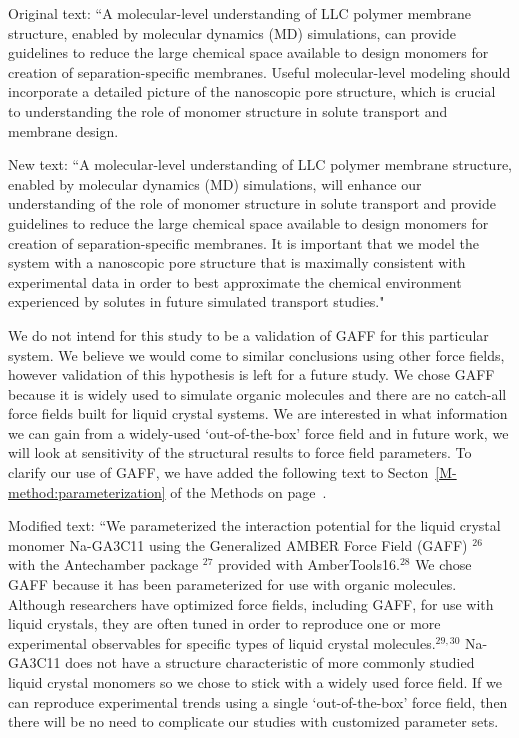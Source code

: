\documentclass{article}
\begin{document}
\begin{enumerate}
    Original text: ``A molecular-level understanding of LLC polymer membrane
    structure, enabled by molecular dynamics (MD) simulations, can provide
    guidelines to reduce the large chemical space available to design monomers for
    creation of separation-specific membranes. Useful molecular-level modeling
    should incorporate a detailed picture of the nanoscopic pore structure, which
    is crucial to understanding the role of monomer structure in solute transport
    and membrane design. 

    New text: ``A molecular-level understanding of LLC polymer membrane
    structure, enabled by molecular dynamics (MD) simulations, will enhance our
    understanding of the role of monomer structure in solute transport and provide
    guidelines to reduce the large chemical space available to design monomers for
    creation of separation-specific membranes. It is important that we model the
    system with a nanoscopic pore structure that is maximally consistent with
    experimental data in order to best approximate the chemical environment experienced
    by solutes in future simulated transport studies."

    We do not intend for this study to be a validation of GAFF for this
    particular system. We believe we would come to similar conclusions using other
    force fields, however validation of this hypothesis is left for a future study.
    We chose GAFF because it is widely used to simulate organic molecules and there
    are no catch-all force fields built for liquid crystal systems. We are interested in
    what information we can gain from a widely-used `out-of-the-box' force field and in future
    work, we will look at sensitivity of the structural results to force field parameters.
    To clarify our use of GAFF, we have added the following text to 
    Secton~\ref{M-method:parameterization} of the Methods on
    page~\pageref{M-method:parameterization}.

    Modified text: ``We parameterized the interaction potential for the liquid crystal
    monomer Na-GA3C11 using the Generalized AMBER Force Field (GAFF) $^{26}$ with the
    Antechamber package $^{27}$ provided with AmberTools16.$^{28}$ {\color{red} We 
    chose GAFF because it has been parameterized for use with organic molecules. 
    Although researchers have optimized force fields, including GAFF, for use with 
    liquid crystals, they are often tuned in order to reproduce one or more experimental
    observables for specific types of liquid crystal molecules.$^{29,30}$ Na-GA3C11
    does not have a structure characteristic of more commonly studied liquid crystal
    monomers so we chose to stick with a widely used force field. If we can reproduce
    experimental trends using a single `out-of-the-box' force field, then there will 
    be no need to complicate our studies with customized parameter sets.}


\end{enumerate}
\end{document}
